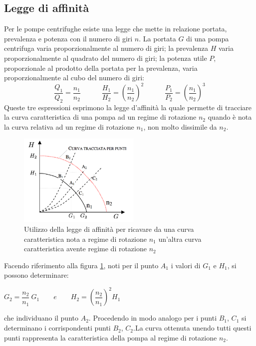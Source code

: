 \documentclass[laurea,oneside,11pt]{USiena_tesiLM}
\begin{document}
\subsection{Legge di affinità}
Per le pompe centrifughe esiste una legge che mette in relazione portata, prevalenza e potenza con il numero di giri $n$.
La portata $G$ di una pompa centrifuga varia proporzionalmente al numero di giri; la prevalenza $H$ varia proporzionalmente al quadrato del numero di giri; la potenza utile $P$, proporzionale al prodotto della portata per la prevalenza, varia proporzionalmente al cubo del numero di giri:
\begin{equation}
\frac{Q_1}{Q_2}=\frac{n_1}{n_2} \quad \qquad  \frac{H_{1}}{H_{2}}=\left( \frac{n_1}{n_2}\right)^2 \quad \qquad  \frac{P_1}{P_2}=\left( \frac{n_1}{n_2}\right)^3
\end{equation}
Queste tre espressioni esprimono la legge d'affinità la quale permette di tracciare la curva caratteristica di una pompa ad un regime di rotazione $n_2$ quando è nota la curva relativa ad un regime di rotazione $n_1$, non molto dissimile da $n_2$.

\begin{figure}[!ht]
\centering
\includegraphics[width=0.52\textwidth]{figure/affinita} 
\caption{Utilizzo della legge di affinità per ricavare da una curva caratteristica nota a regime di rotazione $n_1$ un'altra curva caratteristica avente regime di rotazione $n_2$}
\label{fig:affinita}
\end{figure}

Facendo riferimento alla figura \ref{fig:affinita}, noti per il punto $A_1$ i valori di $G_1$ e $H_1$, si possono determinare:

\begin{center}
$G_2 = \dfrac{n_2}{n_1} \ G_1 \qquad e \qquad H_2 = \left( \dfrac{n_2}{n_1}\right)^2  H_1$
\end{center}

che individuano il punto $A_2$. Procedendo in modo analogo per i punti $B_1$, $C_1$ si determinano i corrispondenti punti $B_2$, $C_2$.La curva ottenuta unendo tutti questi punti rappresenta la caratteristica della pompa al regime di rotazione $n_2$.
\end{document}
